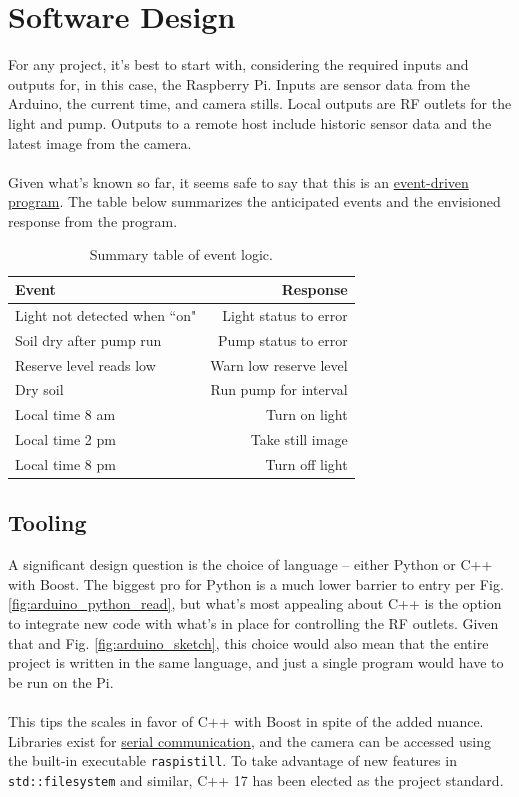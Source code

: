 \documentclass[]{article}
\begin{document}
\newpage

\section{Software Design}
For any project, it's best to start with, considering the required inputs and outputs for, in this case, the Raspberry Pi.  Inputs are sensor data from the Arduino, the current time, and camera stills.  Local outputs are RF outlets for the light and pump.  Outputs to a remote host include historic sensor data and the latest image from the camera.
\\\\
Given what's known so far, it seems safe to say that this is an \href{https://www.techopedia.com/definition/7083/event-driven-program}{event-driven program}.  The table below summarizes the anticipated events and the envisioned response from the program.
\begin{table}[h]
	\centering
	\caption{Summary table of event logic.}
	\begin{tabular}{l|r}
		\textbf{Event} & \textbf{Response} \\ \hline
		Light not detected when ``on" & Light status to error \\ \hline
		Soil dry after pump run & Pump status to error \\ \hline
		Reserve level reads low & Warn low reserve level \\ \hline
		Dry soil & Run pump for interval \\ \hline
		Local time 8 am & Turn on light \\ \hline
		Local time 2 pm & Take still image \\ \hline
		Local time 8 pm & Turn off light \\ \hline
	\end{tabular}	
\end{table}

\subsection{Tooling}
A significant design question is the choice of language -- either Python or C++ with Boost.  The biggest pro for Python is a much lower barrier to entry per Fig. \ref{fig:arduino_python_read}, but what's most appealing about C++ is the option to integrate new code with what's in place for controlling the RF outlets.  Given that and Fig. \ref{fig:arduino_sketch}, this choice would also mean that the entire project is written in the same language, and just a single program would have to be run on the Pi.  
\\\\
This tips the scales in favor of C++ with Boost in spite of the added nuance.  Libraries exist for \href{https://www.boost.org/doc/libs/1_65_0/doc/html/boost_asio/overview/serial_ports.html}{serial communication}, and the camera can be accessed using the built-in executable \verb|raspistill|.  To take advantage of new features in \verb|std::filesystem| and similar, C++ 17 has been elected as the project standard.
\end{document}
